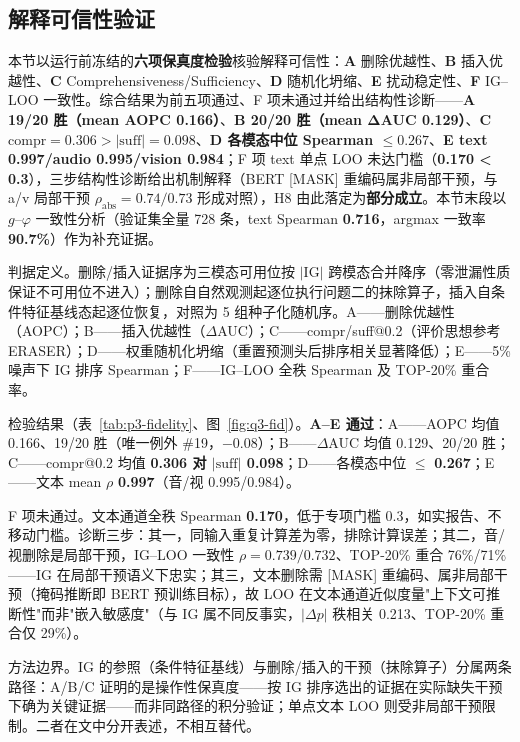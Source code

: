 \documentclass[colorprint,nocoverzero]{gmcmthesis}
\begin{document}
\subsection{解释可信性验证}\label{subsec:q3-fid}
本节以运行前冻结的\textbf{六项保真度检验}核验解释可信性：\textbf{A} 删除优越性、\textbf{B} 插入优越性、\textbf{C} Comprehensiveness/Sufficiency、\textbf{D} 随机化坍缩、\textbf{E} 扰动稳定性、\textbf{F} IG–LOO 一致性。综合结果为前五项通过、F 项未通过并给出结构性诊断——\textbf{A 19/20 胜（mean AOPC 0.166）}、\textbf{B 20/20 胜（mean ΔAUC 0.129）}、\textbf{C $\mathrm{compr}=0.306>\lvert\mathrm{suff}\rvert=0.098$}、\textbf{D 各模态中位 Spearman $\le 0.267$}、\textbf{E text 0.997/audio 0.995/vision 0.984}；F 项 text 单点 LOO 未达门槛（\textbf{0.170 < 0.3}），三步结构性诊断给出机制解释（BERT [MASK] 重编码属非局部干预，与 a/v 局部干预 $\rho_{\mathrm{abs}}=0.74/0.73$ 形成对照），H8 由此落定为\textbf{部分成立}。本节末段以 $g$–$\varphi$ 一致性分析（验证集全量 728 条，text Spearman \textbf{0.716}，argmax 一致率 \textbf{90.7\%}）作为补充证据。

判据定义。删除/插入证据序为三模态可用位按 $|\mathrm{IG}|$ 跨模态合并降序（零泄漏性质保证不可用位不进入）；删除自自然观测起逐位执行问题二的抹除算子，插入自条件特征基线态起逐位恢复，对照为 5 组种子化随机序。A——删除优越性（AOPC）；B——插入优越性（$\Delta$AUC）；C——compr/suff@0.2（评价思想参考 ERASER\cite{deyoung2020eraser}）；D——权重随机化坍缩（重置预测头后排序相关显著降低）；E——5\% 噪声下 IG 排序 Spearman；F——IG--LOO 全秩 Spearman 及 TOP-20\% 重合率。

检验结果（表~\ref{tab:p3-fidelity}、图~\ref{fig:q3-fid}）。\textbf{A--E 通过}：A——AOPC 均值 0.166、19/20 胜（唯一例外 \#19，$-0.08$）；B——$\Delta$AUC 均值 0.129、20/20 胜；C——compr@0.2 均值 \textbf{0.306 对 $|\mathrm{suff}|$ 0.098}；D——各模态中位 $\le$ \textbf{0.267}；E——文本 mean $\rho$ \textbf{0.997}（音/视 0.995/0.984）。

F 项未通过。文本通道全秩 Spearman \textbf{0.170}，低于专项门槛 0.3，如实报告、不移动门槛。诊断三步：其一，同输入重复计算差为零，排除计算误差；其二，音/视删除是局部干预，IG--LOO 一致性 $\rho=0.739/0.732$、TOP-20\% 重合 76\%/71\%——IG 在局部干预语义下忠实；其三，文本删除需 [MASK] 重编码、属非局部干预（掩码推断即 BERT 预训练目标），故 LOO 在文本通道近似度量"上下文可推断性"而非"嵌入敏感度"（与 IG 属不同反事实，$|\Delta p|$ 秩相关 0.213、TOP-20\% 重合仅 29\%）。

方法边界。IG 的参照（条件特征基线）与删除/插入的干预（抹除算子）分属两条路径：A/B/C 证明的是操作性保真度——按 IG 排序选出的证据在实际缺失干预下确为关键证据——而非同路径的积分验证；单点文本 LOO 则受非局部干预限制。二者在文中分开表述，不相互替代。
\end{document}
